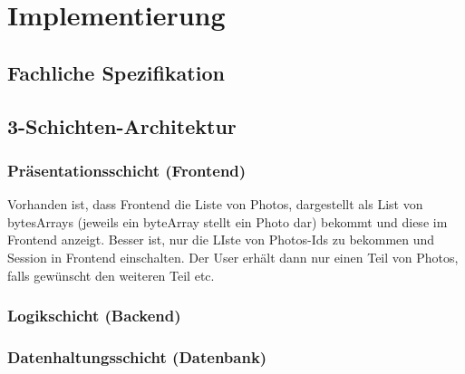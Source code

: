 \chapter{Implementierung}\label{implement}

\section{Fachliche Spezifikation}

\section{3-Schichten-Architektur}

\subsection{Präsentationsschicht (Frontend)}

Vorhanden ist, dass Frontend die Liste von Photos, dargestellt als List von bytesArrays (jeweils ein byteArray stellt ein Photo dar) bekommt und diese im Frontend anzeigt. Besser ist, nur die LIste von Photos-Ids zu bekommen und  Session in Frontend einschalten. Der User erhält dann nur einen Teil von Photos, falls gewünscht den weiteren Teil etc.

\subsection{Logikschicht (Backend)}

\subsection{Datenhaltungsschicht (Datenbank)}

